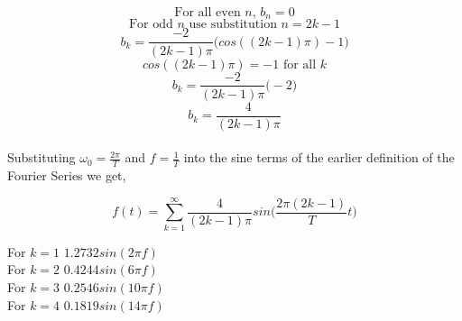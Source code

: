 \documentclass[a4paper,titlepage]{article}
\begin{document}
	$$\text{For all even $n$, } b_n = 0$$
	$$\text{For odd $n$ use substitution $n = 2k-1$}$$
	$$b_k = \frac{-2}{(2k-1) \pi} \Big(cos((2k-1) \pi) - 1 \Big)$$
	$$cos((2k-1) \pi) = -1 \text{ for all $k$}$$
	$$b_k = \frac{-2}{(2k-1) \pi} \Big(-2 \Big)$$
	$$b_k = \frac{4}{(2k-1) \pi}$$
	\\
	Substituting $\omega_0 = \frac{2 \pi}{T}$ and $f = \frac{1}{T}$ into the sine terms of the earlier definition of the Fourier Series we get,
	
	$$f(t) = \sum_{k=1}^{\infty} \frac{4}{(2k-1) \pi} sin\Big(\frac{2 \pi (2k-1)}{T}t \Big)$$
	
	
	For $k=1$   $1.2732 sin(2 \pi f)$
	\\For $k=2$ 	$0.4244 sin(6 \pi f)$
	\\For $k=3$		$0.2546 sin(10 \pi f)$
	\\For $k=4$		$0.1819 sin(14 \pi f)$
	
	
	
\end{document}

